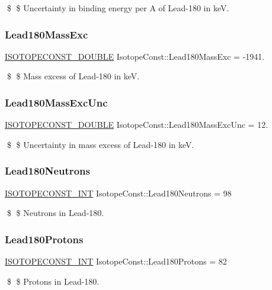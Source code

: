 \$ \$ Uncertainty in binding energy per A of Lead-\/180 in keV. \mbox{\label{group___isotope_const-_lead-_pb180_ga210900f74aba58d481c8dc585efb9759}} 
\subsubsection{\texorpdfstring{Lead180\+Mass\+Exc}{Lead180MassExc}}
{\footnotesize\ttfamily \mbox{\hyperlink{group___isotope_const-_macros_ga8f45a7272ce02c0b4c65c44636ed719a}{I\+S\+O\+T\+O\+P\+E\+C\+O\+N\+S\+T\+\_\+\+D\+O\+U\+B\+LE}} Isotope\+Const\+::\+Lead180\+Mass\+Exc = -\/1941.}

\$ \$ Mass excess of Lead-\/180 in keV. \mbox{\label{group___isotope_const-_lead-_pb180_ga671b73618cf430c409bf19f6cf420c9e}} 
\subsubsection{\texorpdfstring{Lead180\+Mass\+Exc\+Unc}{Lead180MassExcUnc}}
{\footnotesize\ttfamily \mbox{\hyperlink{group___isotope_const-_macros_ga8f45a7272ce02c0b4c65c44636ed719a}{I\+S\+O\+T\+O\+P\+E\+C\+O\+N\+S\+T\+\_\+\+D\+O\+U\+B\+LE}} Isotope\+Const\+::\+Lead180\+Mass\+Exc\+Unc = 12.}

\$ \$ Uncertainty in mass excess of Lead-\/180 in keV. \mbox{\label{group___isotope_const-_lead-_pb180_ga879000a27f7e99cd638d9df05b23bca2}} 
\subsubsection{\texorpdfstring{Lead180\+Neutrons}{Lead180Neutrons}}
{\footnotesize\ttfamily \mbox{\hyperlink{group___isotope_const-_macros_ga5f18360b3e99483a35c32d789e62621c}{I\+S\+O\+T\+O\+P\+E\+C\+O\+N\+S\+T\+\_\+\+I\+NT}} Isotope\+Const\+::\+Lead180\+Neutrons = 98}

\$ \$ Neutrons in Lead-\/180. \mbox{\label{group___isotope_const-_lead-_pb180_ga1fd3a5ed716df82dbe8d28757e44b409}} 
\subsubsection{\texorpdfstring{Lead180\+Protons}{Lead180Protons}}
{\footnotesize\ttfamily \mbox{\hyperlink{group___isotope_const-_macros_ga5f18360b3e99483a35c32d789e62621c}{I\+S\+O\+T\+O\+P\+E\+C\+O\+N\+S\+T\+\_\+\+I\+NT}} Isotope\+Const\+::\+Lead180\+Protons = 82}

\$ \$ Protons in Lead-\/180. 
